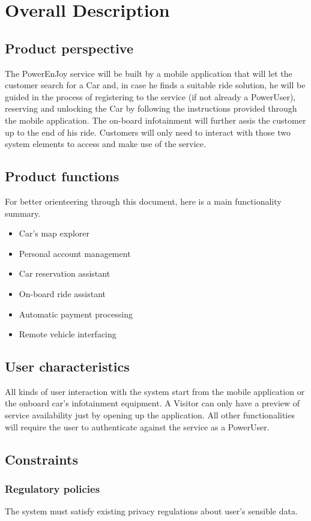 \section{Overall Description}
\subsection{Product perspective}
The PowerEnJoy service will be built by a mobile application that will let the customer search for a Car and, in case he finds a suitable ride solution, he will be guided in the process of registering to the service (if not already a PowerUser), reserving and unlocking the Car by following the instructions provided through the mobile application. The on-board infotainment will further assis the customer up to the end of his ride. Customers will only need to interact with those two system elements to access and make use of the service.
\subsection{Product functions}
For better orienteering through this document, here is a main functionality summary.
\begin{itemize}
\item Car's map explorer
\item Personal account management
\item Car reservation assistant
\item On-board ride assistant
\item Automatic payment processing
\item Remote vehicle interfacing
\end{itemize}
\subsection{User characteristics}
All kinds of user interaction with the system start from the mobile application or the onboard car's infotainment equipment. A Visitor can only have a preview of service availability just by opening up the application. All other functionalities will require the user to authenticate against the service as a PowerUser.
\subsection{Constraints}
\subsubsection{Regulatory policies}
The system must satisfy existing privacy regulations about user's sensible data.
